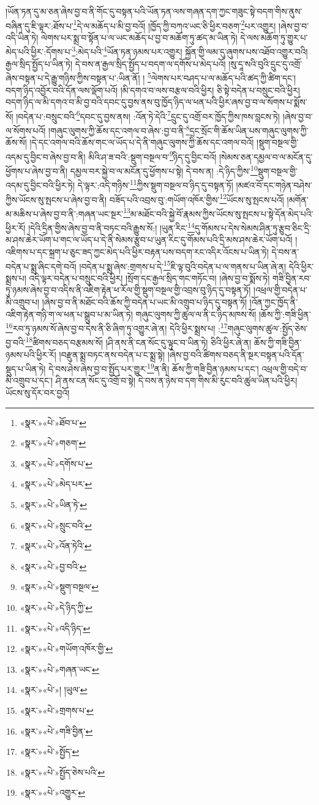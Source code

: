 །ཡོན་ཏན་དུ་མ་ཅན་ཞེས་བྱ་བ་ནི་གོང་དུ་བསྟན་པའི་ཡོན་ཏན་ལས་གཞན་དག་ཀྱང་གཟུང་སྟེ་བདག་གིས་ནུས་བཞིན་དུ་ཇི་ལྟར་:ཐོས་པ་\footnote{«སྣར་»«པེ་»ཐོབ་པ་}དེ་ལ་མཆོད་པ་མི་བྱ་བའོ། །ཁྱོད་ཀྱི་བཀའ་ཡང་ཅི་ཕྱིར་བཅག་\footnote{«སྣར་»«པེ་»གཅག་}པར་འགྱུར། །ཞེས་བྱ་བ་འདི་ཡིན་ཏེ། ལེགས་པར་སྨྲ་བ་སྟོན་པ་ལ་ཡང་མཆོད་པ་བྱ་བ་མཆོག་ཏུ་ཚད་མ་ཡིན་ཏེ། དེ་ལས་མཆོག་ཏུ་གྱུར་པ་མེད་པའི་ཕྱིར་:དོགས་པ་\footnote{«སྣར་»«པེ་»དགོས་པ་}:མེད་པའི་\footnote{«སྣར་»«པེ་»མེད་པར་}ཡོན་ཏན་ཉམས་པར་འགྱུར། སྐྱོན་གྱི་ལམ་དུ་ཞུགས་པས་འཐོབ་འགྱུར་བའི། རྒྱལ་སྲིད་སྤྱོད་པ་ཡིན་ཏེ། དེ་བས་ན་རྒྱལ་སྲིད་སྤྱོད་པ་བདག་ལ་དགོས་པ་མེད་པའོ། །སུ་དཱ་སའི་བུའི་དྲུང་དུ་འགྲོ་ཞེས་བསྟན་པ་དེ་རྒྱུ་གཉིས་ཀྱིས་བསྟན་པ་:ཡིན་ནོ། །
\footnote{«སྣར་»«པེ་»ཡིན་ཏེ་}ལེགས་པར་བཤད་པ་ལ་མཆོད་པའི་ཚད་ཀྱི་ཚིག་དང་། བདག་ཉིད་འབྱོར་བའི་དོན་ལས་ལྡོག་པའོ། །མི་དགའ་བ་ལས་བརྩལ་བའི་ཕྱིར། ཅི་སྟེ་བདེན་པ་བསྲུང་བའི་ཕྱིར། བདག་ཉིད་ལ་མི་དགའ་བ་མི་བྱ་བའི་དབང་དུ་བྱས་ནས་བུ་ཁྱོད་ཉིད་ལ་ཕན་པའི་ཕྱིར་ཞས་བྱ་བ་ལ་སོགས་པ་སྨོས་སོ། །བདེན་པ་:བསྲུང་བའི་\footnote{«སྣར་»«པེ་»སྲུང་བའི་}དབང་དུ་བྱས་ནས། :འོན་ཏེ་དེའི་\footnote{«སྣར་»«པེ་»འོན་ཏེའི་}དྲུང་དུ་འགྲོ་བར་ཁྱོད་ཀྱིས་ཁས་བླངས་ཏེ། །ཞེས་བྱ་བ་ལ་སོགས་པའོ། །གཞུང་ལུགས་ཀྱི་ཆོས་དང་འགལ་བ་ཞེས་:བྱ་བ་ནི་\footnote{«སྣར་»«པེ་»བྱ་བའི་}དྲང་སྲོང་གི་ཆོས་ཡིན་པས་གཞུང་ལུགས་ཀྱི་ཆོས་སོ། །དེ་དང་འགལ་བའི་ཆོས་གང་ལ་ཡོད་པ་དེ་ནི་གཞུང་ལུགས་ཀྱི་ཆོས་དང་འགལ་བའོ། །སྡུག་བསྔལ་གྱི་འདམ་དུ་བྱིང་བ་ཞེས་བྱ་བ་ནི། མིའི་ཤ་ཟ་བའི་:སྡུག་བསྔལ་བ་\footnote{«སྣར་»«པེ་»སྡུག་བསྔལ་}ཉིད་དུ་བྱིང་བའོ། །སེམས་ཅན་དམྱལ་བ་ལ་མངོན་དུ་ཕྱོགས་པ་ཞེས་བྱ་བ་ནི། དམྱལ་བར་སྐྱེ་བ་ལ་མངོན་དུ་ཕྱོགས་པ་སྟེ། དེ་བས་ན། :དེ་ཉིད་ཀྱིས་\footnote{«སྣར་»«པེ་»དེ་ཉིད་ཀྱི་}སྡུག་བསྔལ་གྱི་འདམ་དུ་བྱིང་བའི་ཕྱིར་ཏེ། དེ་ལྟར་:འདི་གཉིས་\footnote{«སྣར་»«པེ་»འདི་ཉིད་}ཀྱིས་སྡུག་བསྔལ་བ་ཉིད་དུ་བསྟན་ཏོ། །མཛའ་བོ་དང་གཉེན་བཤེས་ཀྱིས་ཡོངས་སུ་སྤངས་པ་ཞེས་བྱ་བ་ནི། བཟོད་པའི་འབྲས་བུ་:གཡོག་འཁོར་གྱིས་\footnote{«སྣར་»«པེ་»གཡོག་འཁོར་གྱི་}ཡོངས་སུ་སྤངས་པའོ། །མགོན་མ་མཆིས་པ་ཞེས་བྱ་བ་ནི་:གཞན་ཡང་སྔར་\footnote{«སྣར་»«པེ་»གཞན་ཡང་}མ་མཐོང་བའི་སྐྱེ་བོ་རྣམས་ཀྱིས་ཡོངས་སུ་སྤངས་པ་སྟེ་དོན་མེད་པའི་ཕྱིར་རོ། །དེའི་དྲིན་གྱིས་ཞེས་བྱ་བ་ནི་བཏང་བའི་རྒྱུས་སོ:། །ཡུན་རིང་\footnote{«སྣར་»«པེ་»། །ཡུལ་}དུ་གོམས་པ་དེས་སེམས་ཤིན་ཏུ་རྩུབ་ཅིང་དྲི་མ་ཤས་ཆེར་ཡོག་པ་གང་ལ་ཡོད་པ་དེ་ནི་སེམས་རྩུབ་པ་ཡུན་རིང་དུ་གོམས་པའི་དྲི་མས་ཤས་ཆེར་ཡོག་པའོ། །འཇིགས་པ་དང་སྐྲག་པ་ཅུང་ཟད་ཀྱང་མེད་པའི་ཕྱིར་བརྟན་པས་བདག་རང་འདིར་འོངས་པ་ཡིན་ཏེ། དེ་བས་ན་བདེན་པ་སྨྲ་ཞིང་དགེ་བའོ། །བདེན་པ་སྨྲ་ཞེས་:གྲགས་པ་དེ་\footnote{«སྣར་»«པེ་»གྲགས་པ་}ཇི་ལྟ་བུའི་བདེན་པ་ལ་གནས་པ་ཡིན་ཞེ་ན། དེའི་ཕྱིར་སྨྲས་པ། འདི་ལྟར་བདེན་པ་བསྲུང་བའི་ཕྱིར། །སྲོག་དང་རྒྱལ་སྲིད་གང་གཏོང་བ། །ཞེས་བྱ་བ་སྨོས་ཏེ། གཟི་བྱིན་རབ་ཏུ་ཉམས་ཞེས་བྱ་བ་འདིས་ནི་འཇིག་རྟེན་ཕ་རོལ་གྱི་སྡུག་བསྔལ་གྱི་འབྲས་བུ་ཉིད་དུ་བསྟན་ཏོ། །འཕྲལ་གྱི་བདེན་པ་མི་འགྲུབ་པ། །ཞེས་བྱ་བ་ནི་མཐོང་བའི་ཆོས་ཀྱི་བདེན་པ་ཡང་མི་འགྲུབ་པ་ཉིད་དུ་བསྟན་ཏོ། །འོན་ཀྱང་ཁྱོད་ནི་འཇིག་རྟེན་གཉི་ག་ལ་ཕན་པ་སྒྲུབ་པ་མ་ཡིན་ཏེ། གཞུང་ལུགས་ཀྱི་ཚུལ་ལ་ནི་ང་ཉིད་མཁས་སོ། །ཆོས་ཀྱི་:གཟི་ཕྱིན་\footnote{«སྣར་»«པེ་»གཟི་བྱིན་}རབ་ཏུ་ཉམས་སོ་ཞེས་བྱ་བ་དེས་ནི་ཅི་ཞིག་ཏུ་འགྱུར་ཞེ་ན། དེའི་ཕྱིར་སྨྲས་པ། :\footnote{«སྣར་»«པེ་»སྤྱོད་}གཞུང་ལུགས་ཚུལ་:སྤྱོད་ཅེས་བྱ་བའི་\footnote{«སྣར་»«པེ་»སྤྱོད་ཅེས་པའི་}ཚིགས་བཅད་བརྩམས་སོ། །ཤི་ནས་ནི་ངན་སོང་དུ་ལྟུང་བ་ཡིན་ཏེ། ཅིའི་ཕྱིར་ཞེ་ན། ཆོས་ཀྱི་གཟི་བྱིན་ཉམས་པའི་ཕྱིར་རོ། །བརྫུན་སྨྲ་བཏང་ནས་བདེན་པ་ང་སྨྲ་སྟེ། །ཞེས་བྱ་བའི་ཚིགས་བཅད་ནི་སྔར་བསྟན་པའི་དོན་སྡུད་པ་ཡིན་ཏེ། དེ་བས་ཤེས་ཞེས་བྱ་བ་སྤྱོད་པར་གྱུར་\footnote{«སྣར་»«པེ་»འགྱུར་}ན་ནི། ཆོས་ཀྱི་གཟི་བྱིན་ཉམས་པ་དང་། འཕྲལ་གྱི་བདེ་བ་མི་འགྲུབ་པ་དང་། ཤི་ནས་ངན་སོང་དུ་འགྲོ་བ་སྟེ། དེ་བས་ན་ཉེས་བ་དག་གིས་མི་རུང་བའི་ཚུལ་ཡིན་པའི་ཕྱིར། ཡོངས་སུ་དོར་བར་བྱའོ། 